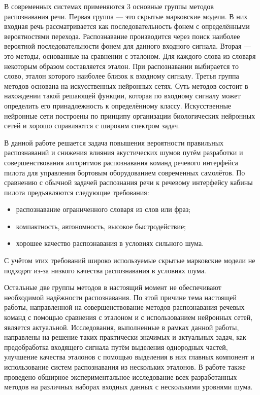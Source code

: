 В современных системах применяются 3 основные группы методов распознавания речи.
Первая группа --- это скрытые марковские модели.
В них входная речь рассматривается как последовательность фонем с определёнными вероятностями перехода.
Распознавание производится через поиск наиболее вероятной последовательности фонем для данного входного сигнала.
Вторая --- это методы, основанные на сравнении с эталоном.
Для каждого слова из словаря некоторым образом составляется эталон.
При распознавании выбирается то слово, эталон которого наиболее близок к входному сигналу.
Третья группа методов основана на искусственных нейронных сетях.
Суть методов состоит в нахождении такой решающей функции, которая по входному сигналу может определить его принадлежность к определённому классу.
Искусственные нейронные сети построены по принципу организации биологических нейронных сетей и хорошо справляются с широким спектром задач.

В данной работе решается задача повышения вероятности правильных распознаваний и снижения влияния акустических шумов путём разработки и совершенствования алгоритмов распознавания команд речевого интерфейса пилота для управления бортовым оборудованием современных самолётов.
По сравнению с обычной задачей распознания речи к речевому интерфейсу кабины пилота предъявляются следующие требования:

\begin{itemize}
	\item распознавание ограниченного словаря из слов или фраз;
	\item компактность, автономность, высокое быстродействие;
	\item хорошее качество распознавания в условиях сильного шума.
\end{itemize}

С учётом этих требований широко используемые скрытые марковские модели не подходят из-за низкого качества распознавания в условиях шума.

Остальные две группы методов в настоящий момент не обеспечивают необходимой надёжности распознавания.
По этой причине тема настоящей работы, направленной на совершенствование методов распознавания речевых команд с помощью сравнения с эталоном и с использованием нейронных сетей, является актуальной.
Исследования, выполненные в рамках данной работы, направлены на решение таких практически значимых и актуальных задач, как предобработка входящего сигнала путём выделения однородных частей, улучшение качества эталонов с помощью выделения в них главных компонент и использование систем распознавания из нескольких эталонов.
В работе также проведено обширное экспериментальное исследование всех разработанных методов на различных наборах входных данных с несколькими уровнями шума.

